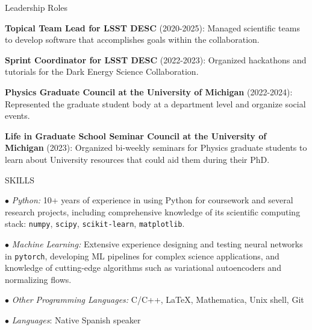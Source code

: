 \documentclass{resume} %
\newcommand{\pytorch}[0]{\texttt{pytorch}}
\begin{document}
\begin{rSection}{Leadership Roles} \itemsep -3pt \vspace*{-.25cm}

\item{\textbf{Topical Team Lead for LSST DESC} (2020-2025): Managed scientific teams to develop software that accomplishes goals within the collaboration.}

\item{\textbf{Sprint Coordinator for LSST DESC} (2022-2023): Organized hackathons and tutorials for the Dark Energy Science Collaboration.}

\item{\textbf{Physics Graduate Council at the University of Michigan} (2022-2024): Represented the graduate student body at a department level and organize social events.}

\item{\textbf{Life in Graduate School Seminar Council at the University of Michigan} (2023): Organized bi-weekly seminars for Physics graduate students to learn about University resources that could aid them during their PhD.}
\end{rSection}


\begin{rSection}{SKILLS}
\vspace*{-0.3cm}
\item {\small $\bullet$} \textit{Python:} 10+ years of experience in using Python for coursework and several research projects, including comprehensive knowledge of its scientific computing stack: \texttt{numpy}, \texttt{scipy}, \texttt{scikit-learn},
\texttt{matplotlib}.

\item {\small $\bullet$} \textit{Machine Learning:} Extensive experience designing and testing neural networks in \pytorch, developing ML pipelines for complex science applications, and knowledge of cutting-edge algorithms such as variational autoencoders and normalizing flows.

\item {\small $\bullet$} \textit{Other Programming Languages:} C/C++, \LaTeX, Mathematica, Unix shell, Git   

\item {\small $\bullet$} \textit{Languages}: Native Spanish speaker
\end{rSection}
\end{document}
